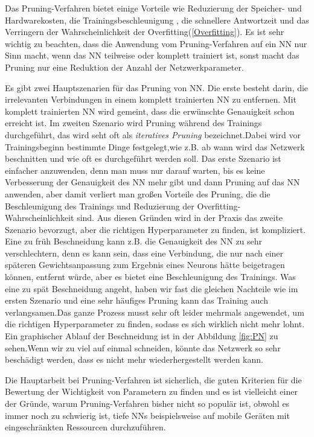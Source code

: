\documentclass[12pt,a4paper]{scrartcl}
\numberwithin{equation}{section}
\begin{document}
Das Pruning-Verfahren bietet einige Vorteile wie Reduzierung der Speicher- und Hardwarekosten, die Trainingsbeschleunigung , die schnellere Antwortzeit und das Verringern der Wahrscheinlichkeit der Overfitting(\ref{Overfitting}).
Es ist sehr wichtig zu beachten, dass die Anwendung vom Pruning-Verfahren auf ein \ac{NN} nur Sinn macht, wenn das \ac{NN} teilweise oder komplett trainiert ist, sonst macht das Pruning nur eine Reduktion der Anzahl der Netzwerkparameter.

Es gibt zwei Hauptszenarien für das Pruning von \ac{NN}.
Die erste besteht darin, die irrelevanten Verbindungen in einem komplett trainierten \ac{NN} zu entfernen. Mit komplett trainierten \ac{NN} wird gemeint, dass die erwünschte Genauigkeit schon erreicht ist. Im zweiten Szenario wird Pruning während des Trainings durchgeführt, das wird seht oft als \textit{iteratives Pruning} bezeichnet.Dabei wird vor Trainingsbeginn  bestimmte Dinge festgelegt,wie z.B. ab wann wird das Netzwerk beschnitten und wie oft es durchgeführt werden soll. 
Das erste Szenario ist einfacher anzuwenden, denn man muss nur darauf warten, bis es keine Verbesserung der Genauigkeit des \ac{NN} mehr gibt und dann Pruning auf das \ac{NN} anwenden, aber damit verliert man großen Vorteile des Pruning, die die Beschleunigung des Trainings und Reduzierung der Overfitting-Wahrscheinlichkeit sind.
Aus diesen Gründen wird in der Praxis das zweite Szenario bevorzugt, aber die richtigen Hyperparameter zu finden, ist kompliziert. Eine zu früh Beschneidung kann z.B. die Genauigkeit des \ac{NN} zu sehr verschlechtern, denn es kann sein, dass eine Verbindung, die nur nach einer späteren Gewichtsanpassung zum Ergebnis eines Neurons  hätte beigetragen können, entfernt würde, aber es bietet eine Beschleunigung des Trainings. Was eine zu spät Beschneidung angeht, haben wir fast die gleichen Nachteile wie im ersten Szenario und eine sehr häufiges Pruning kann das Training  auch verlangsamen.Das ganze Prozess musst sehr oft leider mehrmals angewendet, um die richtigen Hyperparameter zu finden, sodass es sich wirklich nicht mehr lohnt. Ein graphischer Ablauf der Beschneidung ist in der Abbildung \ref{fig:PN} zu sehen.Wenn wir zu viel auf einmal schneiden, könnte das Netzwerk so sehr beschädigt werden, dass es nicht mehr wiederhergestellt werden kann.

Die Hauptarbeit bei Pruning-Verfahren ist sicherlich, die guten Kriterien für die Bewertung der Wichtigkeit von Parametern zu finden und es ist vielleicht einer der Gründe, warum Pruning-Verfahren bisher nicht so populär ist, obwohl es immer noch zu schwierig ist, tiefe \acsp{NN} beispielsweise auf  mobile Geräten mit eingeschränkten Ressourcen durchzuführen.
\end{document}
